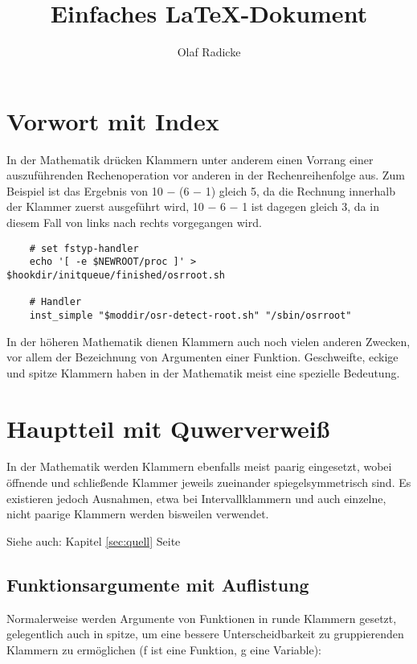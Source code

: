 \documentclass[10pt,a4paper]{article}
\author{Olaf Radicke}
\title{Einfaches LaTeX-Dokument}
\begin{document}
\maketitle

\newpage

\tableofcontents

\newpage

\section {Vorwort mit Index}

In der Mathematik drücken Klammern unter anderem einen Vorrang einer
auszuführenden Rechenoperation vor anderen in der Rechenreihenfolge aus. Zum
Beispiel ist das Ergebnis von 10 − (6 − 1) gleich 5, da
die Rechnung innerhalb
der Klammer zuerst ausgeführt wird, 10 − 6 − 1 ist dagegen gleich 3, da in
diesem Fall von links nach rechts vorgegangen wird.

\begin{lstlisting}
    # set fstyp-handler
    echo '[ -e $NEWROOT/proc ]' > $hookdir/initqueue/finished/osrroot.sh

    # Handler
    inst_simple "$moddir/osr-detect-root.sh" "/sbin/osrroot"
\end{lstlisting}


In der höheren Mathematik
dienen Klammern auch noch vielen anderen Zwecken, vor allem der Bezeichnung
von Argumenten einer Funktion. Geschweifte, eckige und spitze Klammern haben
in der Mathematik meist eine spezielle Bedeutung.

\section{Hauptteil mit Quwerverweiß}

In der Mathematik werden Klammern ebenfalls meist paarig eingesetzt, wobei
öffnende und schließende Klammer jeweils zueinander spiegelsymmetrisch sind.
Es existieren jedoch Ausnahmen, etwa bei Intervallklammern und auch einzelne,
nicht paarige Klammern werden bisweilen verwendet.

Siehe auch: Kapitel \ref{sec:quell} Seite \pageref{sec:quell}

\subsection{Funktionsargumente mit Auflistung}

Normalerweise werden Argumente von Funktionen in runde Klammern gesetzt,
gelegentlich auch in spitze, um eine bessere Unterscheidbarkeit zu
gruppierenden Klammern zu ermöglichen (f ist eine Funktion, g eine Variable):
\end{document}
